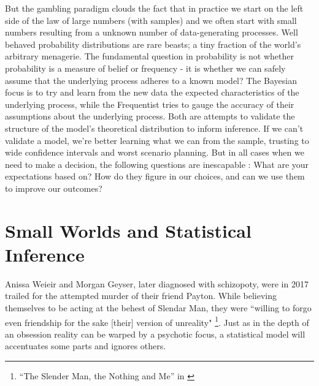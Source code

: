 \documentclass[
]{book}
\theoremstyle{definition}
\theoremstyle{definition}
\theoremstyle{definition}
\theoremstyle{remark}
\begin{document}
But the gambling paradigm clouds the fact that in practice we start on the left side of the law of large numbers (with samples) and we often start with small numbers resulting from a unknown number of data-generating processes. Well behaved probability distributions are rare beasts; a tiny fraction of the world's arbitrary menagerie. The fundamental question in probability is not whether probability is a measure of belief or frequency - it is whether we can safely assume that the underlying process adheres to a known model? The Bayesian focus is to try and learn from the new data the expected characteristics of the underlying process, while the Frequentist tries to gauge the accuracy of their assumptions about the underlying process. Both are attempts to validate the structure of the model's theoretical distribution to inform inference. If we can't validate a model, we're better learning what we can from the sample, trusting to wide confidence intervals and worst scenario planning. But in all cases when we need to make a decision, the following questions are inescapable : What are your expectations based on? How do they figure in our choices, and can we use them to improve our outcomes?

\hypertarget{small-worlds-and-statistical-inference}{%
\section{Small Worlds and Statistical Inference}\label{small-worlds-and-statistical-inference}}

Anissa Weieir and Morgan Geyser, later diagnosed with schizopoty, were in 2017 trailed for the attempted murder of their friend Payton. While believing themselves to be acting at the behest of Slendar Man, they were ``willing to forgo even friendship for the sake {[}their{]} version of unreality" \footnote{``The Slender Man, the Nothing and Me'' in \citep{WangSchizophrenia}}. Just as in the depth of an obsession reality can be warped by a psychotic focus, a statistical model will accentuates some parts and ignores others.
\end{document}
